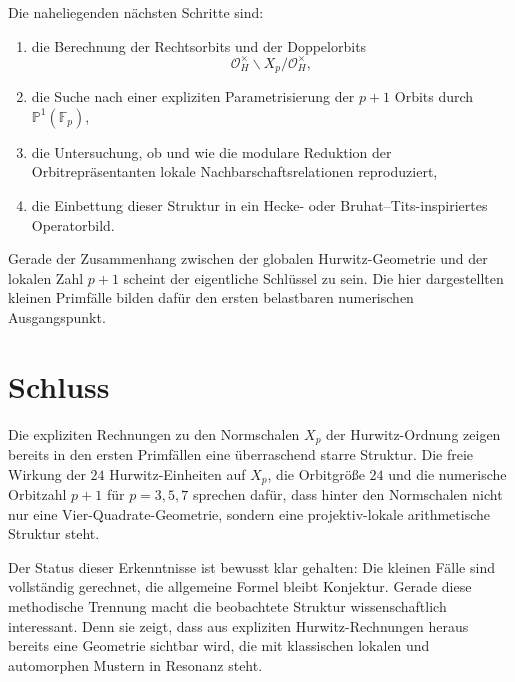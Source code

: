 \documentclass[12pt,a4paper]{article}
\theoremstyle{plain}
\theoremstyle{definition}
\theoremstyle{remark}
\newcommand{\OH}{\mathcal O_H}
\newcommand{\Fp}{\mathbb F_p}
\newcommand{\PP}{\mathbb P}
\begin{document}
	Die naheliegenden nächsten Schritte sind:
	
	\begin{enumerate}
		\item die Berechnung der Rechtsorbits und der Doppelorbits
		\[
		\OH^\times\backslash X_p/\OH^\times,
		\]
		\item die Suche nach einer expliziten Parametrisierung der \(p+1\) Orbits durch
		\(\PP^1(\Fp)\),
		\item die Untersuchung, ob und wie die modulare Reduktion der Orbitrepräsentanten
		lokale Nachbarschaftsrelationen reproduziert,
		\item die Einbettung dieser Struktur in ein Hecke- oder Bruhat--Tits-inspiriertes
		Operatorbild.
	\end{enumerate}
	
	Gerade der Zusammenhang zwischen der globalen Hurwitz-Geometrie und der lokalen Zahl \(p+1\)
	scheint der eigentliche Schlüssel zu sein. Die hier dargestellten kleinen Primfälle bilden dafür
	den ersten belastbaren numerischen Ausgangspunkt.
	
	\section{Schluss}
	
	Die expliziten Rechnungen zu den Normschalen \(X_p\) der Hurwitz-Ordnung zeigen bereits in den
	ersten Primfällen eine überraschend starre Struktur. Die freie Wirkung der \(24\) Hurwitz-Einheiten
	auf \(X_p\), die Orbitgröße \(24\) und die numerische Orbitzahl \(p+1\) für \(p=3,5,7\) sprechen dafür,
	dass hinter den Normschalen nicht nur eine Vier-Quadrate-Geometrie, sondern eine projektiv-lokale
	arithmetische Struktur steht.
	
	Der Status dieser Erkenntnisse ist bewusst klar gehalten: Die kleinen Fälle sind vollständig gerechnet,
	die allgemeine Formel bleibt Konjektur. Gerade diese methodische Trennung macht die beobachtete Struktur
	wissenschaftlich interessant. Denn sie zeigt, dass aus expliziten Hurwitz-Rechnungen heraus bereits
	eine Geometrie sichtbar wird, die mit klassischen lokalen und automorphen Mustern in Resonanz steht.
	
\end{document}
